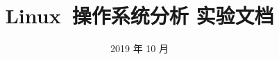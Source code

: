 \documentclass[11pt]{article}
\begin{document}
\title{Linux\ 操作系统分析 实验文档}
\author{}
\date{2019 年 10 月}
\maketitle










% 
% 
\end{document}
